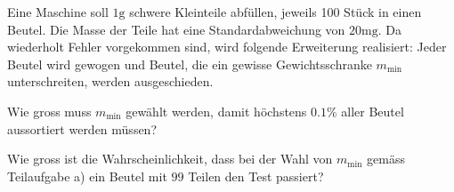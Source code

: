 Eine Maschine soll $1\text{g}$ schwere Kleinteile abfüllen, 
jeweils 100 Stück in einen Beutel.
Die Masse der Teile hat eine Standardabweichung von $20\text{mg}$.
Da wiederholt Fehler vorgekommen sind,
wird folgende Erweiterung realisiert: Jeder Beutel wird gewogen und
Beutel, die ein gewisse Gewichtsschranke $m_{\text{min}}$ unterschreiten,
werden ausgeschieden.
\begin{teilaufgaben}
\item Wie gross muss $m_{\text{min}}$ gewählt werden, damit höchstens
$0.1\%$ aller Beutel aussortiert werden müssen?
\item Wie gross ist die Wahrscheinlichkeit, dass bei der Wahl von
$m_{\text{min}}$ gemäss Teilaufgabe a) ein Beutel mit $99$ Teilen den
Test passiert?
\end{teilaufgaben}

